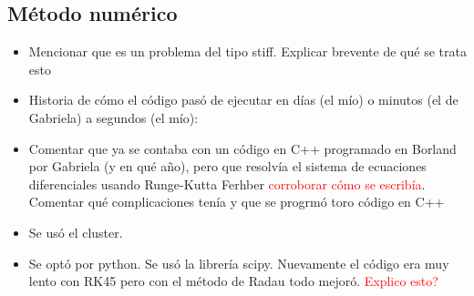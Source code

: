 \documentclass[aps,prb,twocolumn,superscriptaddress,floatfix,longbibliography,10pt]{revtex4-2}
\begin{document}
\subsection{Método numérico}

\begin{itemize}
  \item Mencionar que es un problema del tipo stiff. Explicar brevente de qué se trata esto
  \item Historia de cómo el código pasó de ejecutar en días (el mío) o minutos (el de Gabriela) a segundos (el mío):
  \item Comentar que ya se contaba con un código en C++ programado en Borland por Gabriela (y en qué año), pero que resolvía el sistema de ecuaciones diferenciales usando Runge-Kutta Ferhber \textcolor{red}{corroborar cómo se escribía}. Comentar qué complicaciones tenía y que se progrmó toro código en C++
  \item Se usó el cluster.
  \item Se optó por python. Se usó la librería scipy. Nuevamente el código era muy lento con RK45 pero con el método de Radau todo mejoró. \textcolor{red}{Explico esto?}
\end{itemize}
\end{document}
